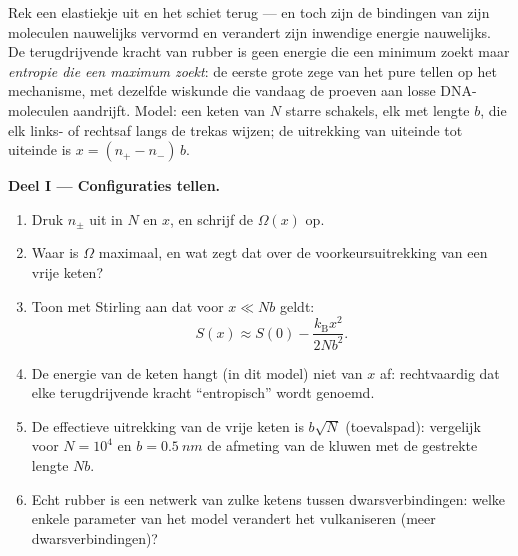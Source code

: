 \begin{problem}\label{pb:b3:microcanonical-ensemble:1}
Rek een elastiekje uit en het schiet terug --- en toch zijn de bindingen
van zijn moleculen nauwelijks vervormd en verandert zijn inwendige energie
nauwelijks. De terugdrijvende kracht van rubber is geen energie die een
minimum zoekt maar \emph{entropie die een maximum zoekt}: de eerste grote
zege van het pure tellen op het mechanisme, met dezelfde wiskunde die
vandaag de proeven aan losse DNA-moleculen aandrijft. Model: een keten van
$N$ starre schakels, elk met lengte $b$, die elk links- of rechtsaf langs
de trekas wijzen; de uitrekking van uiteinde tot uiteinde is $x = (n_+ - n_-)\,b$.

\medskip\noindent\textbf{Deel I --- Configuraties tellen.}
\begin{enumerate}
  \item Druk $n_\pm$ uit in $N$ en $x$, en schrijf de 
        $\Omega(x)$ op.
  \item Waar is $\Omega$ maximaal, en wat zegt dat over de
        voorkeursuitrekking van een vrije keten?
  \item Toon met Stirling aan dat voor $x \ll Nb$ geldt:
        \[
        S(x) \approx S(0) - \frac{k_{\text{B}}x^2}{2Nb^2} .
        \]
  \item De energie van de keten hangt (in dit model) niet van $x$ af:
        rechtvaardig dat elke terugdrijvende kracht ``entropisch'' wordt
        genoemd.
  \item De effectieve uitrekking van de vrije keten is $b\sqrt N$
        (toevalspad): vergelijk voor $N = 10^4$ en $b = \qty{0.5}{nm}$ de
        afmeting van de kluwen met de gestrekte lengte $Nb$.
  \item Echt rubber is een netwerk van zulke ketens tussen dwarsverbindingen:
        welke enkele parameter van het model verandert het vulkaniseren
        (meer dwarsverbindingen)?
\end{enumerate}


\end{problem}
